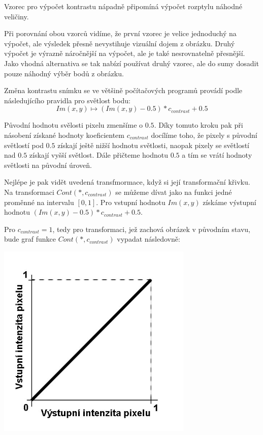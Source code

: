 Vzorec pro výpočet kontrastu nápadně připomíná výpočet rozptylu náhodné veličiny. 

Při porovnání obou vzorců vidíme, že první vzorec je velice jednoduchý na výpočet, ale výsledek přesně nevystihuje vizuální dojem z obrázku. Druhý výpočet je výrazně náročnější na výpočet, ale je také nesrovnatelně přesnější. Jako vhodná alternativa se tak nabízí používat druhý vzorec, ale do sumy dosadit pouze náhodný výběr bodů z obrázku.

Změna kontrastu snímku se ve většině počítačových programů provádí podle následujícího pravidla pro světlost bodu:
\[
  Im(x,y) \longmapsto   (Im(x,y) - 0.5)*c_{contrast} + 0.5
\]

Původní hodnotu svělosti pixelu zmenšíme o $0.5$. Díky tomuto kroku pak při násobení získané hodnoty koeficientem $c_{contrast}$ docílíme toho, že pixely s původní světlostí pod $0.5$ získají ještě nižší hodnotu světlosti, naopak pixely se světlostí nad $0.5$ získají vyšší světlost. Dále přičteme hodnotu $0.5$ a tím se vrátí hodnoty světlosti na původní úroveň.

Nejlépe je pak vidět uvedená transfmormace, když si její transformační křivku. Na transformaci $ Cont(*,c_{contrast}) $ se můžeme dívat jako na funkci jedné proměnné na intervalu $[0,1]$. Pro vstupní hodnotu $ Im(x,y) $ získáme výstupní hodnotu $ (Im(x,y) - 0.5)*c_{contrast} + 0.5 $.

Pro $ c_{contrast}=1 $, tedy pro transformaci, jež zachová obrázek v původním stavu, bude graf funkce $ Cont(*,c_{contrast}) $ vypadat následovně:

\begin{center}
\includegraphics[width=0.7\textwidth,height=0.7\textwidth]{Text/IMG/Kontrast_Identita.jpg}
\end{center}

